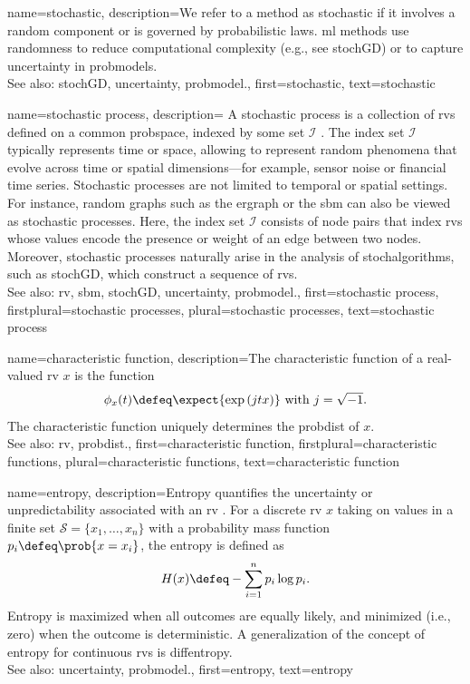 {name={stochastic},
	description={We refer to a  method as stochastic if it involves a 
		random component or is governed by probabilistic laws. \Gls{ml} methods use randomness 
		to reduce computational complexity (e.g., see \gls{stochGD}) or 
		to capture \gls{uncertainty} in \glspl{probmodel}.
		\\
		See also: \gls{stochGD}, \gls{uncertainty}, \gls{probmodel}.},
	first={stochastic},
	text={stochastic}
}

{name={stochastic process},
	description={
		A \gls{stochastic} process is a collection of 
		\glspl{rv} defined on a common \gls{probspace}, indexed by some set 
		$\mathcal{I}$ \cite{papoulis,GrayProbBook,Brockwell91}. The index set 
		$\mathcal{I}$ typically represents time or space, allowing to represent 
		random phenomena that evolve across time or spatial dimensions—for example, 
		sensor noise or financial time series. Stochastic processes are not limited 
		to temporal or spatial settings. For instance, random \glspl{graph} such as 
		the \gls{ergraph} or the \gls{sbm} 
		can also be viewed as stochastic processes. Here, the index set $\mathcal{I}$ 
		consists of node pairs that index \glspl{rv} whose values encode 
		the presence or weight of an edge between two nodes. Moreover, \gls{stochastic} 
		processes naturally arise in the analysis of \glspl{stochalgorithm}, 
		such as \gls{stochGD}, which construct a sequence of \glspl{rv}. 
		\\
		See also:  \gls{rv}, \gls{sbm}, \gls{stochGD}, \gls{uncertainty}, \gls{probmodel}.},
	first={stochastic process},
	firstplural={stochastic processes},
	plural={stochastic processes},
	text={stochastic process}
}

{name={characteristic function},
	description={The characteristic \gls{function} 
		of a real-valued \gls{rv} $x$ is the \gls{function} \cite[Sec. 26]{BillingsleyProbMeasure}
		$$ \phi_{x}(t) \defeq \expect { \exp\,(j t x) } \mbox{ with } j = \sqrt{-1}.$$
	 	The characteristic \gls{function} uniquely determines the \gls{probdist} of $x$. 
		\\
		See also: \gls{rv}, \gls{probdist}.},
	first={characteristic function},
	firstplural={characteristic functions}, 
	plural={characteristic functions},
	text={characteristic function}
}

{name={entropy},
	description={Entropy quantifies the \gls{uncertainty} or unpredictability associated with an \gls{rv} \cite{coverthomas}. 
		For a discrete \gls{rv} $x$ taking on values in a finite set $\mathcal{S} = \{x_1, \ldots, x_n\}$ with 
		a \gls{probability} mass \gls{function} $p_i \defeq \prob{x = x_i}$, the entropy is defined as
		\[
		H(x) \defeq -\sum_{i=1}^n p_i \log p_i.
		\]
		Entropy is maximized when all outcomes are equally likely, and minimized (i.e., zero) 
		when the outcome is deterministic. A \gls{generalization} of the concept of entropy for continuous 
		\glspl{rv} is \gls{diffentropy}. 
		\\
		See also: \gls{uncertainty}, \gls{probmodel}.},
	first={entropy},
	text={entropy}
}

